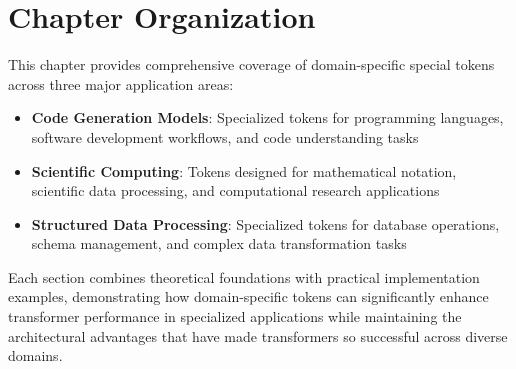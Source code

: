 \section{Chapter Organization}

This chapter provides comprehensive coverage of domain-specific special tokens across three major application areas:

\begin{itemize}
\item \textbf{Code Generation Models}: Specialized tokens for programming languages, software development workflows, and code understanding tasks
\item \textbf{Scientific Computing}: Tokens designed for mathematical notation, scientific data processing, and computational research applications
\item \textbf{Structured Data Processing}: Specialized tokens for database operations, schema management, and complex data transformation tasks
\end{itemize}

Each section combines theoretical foundations with practical implementation examples, demonstrating how domain-specific tokens can significantly enhance transformer performance in specialized applications while maintaining the architectural advantages that have made transformers so successful across diverse domains.
